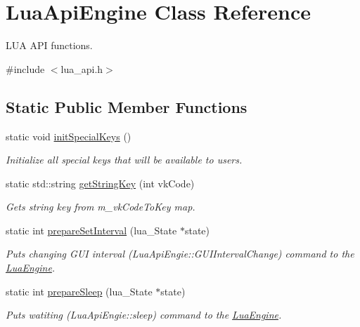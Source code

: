 \hypertarget{class_lua_api_engine}{\section{Lua\-Api\-Engine Class Reference}
\label{class_lua_api_engine}
}


L\-U\-A A\-P\-I functions.  




{\ttfamily \#include $<$lua\-\_\-api.\-h$>$}

\subsection*{Static Public Member Functions}
\begin{DoxyCompactItemize}
\item 
static void \hyperlink{class_lua_api_engine_a7f614e9a85e02951c0a21e694654b83a}{init\-Special\-Keys} ()
\begin{DoxyCompactList}\small\item\em Initialize all special keys that will be available to users. \end{DoxyCompactList}\item 
static std\-::string \hyperlink{class_lua_api_engine_abfc4e4afd5002dddfe5fc2db4519e2fc}{get\-String\-Key} (int vk\-Code)
\begin{DoxyCompactList}\small\item\em Gets string key from m\-\_\-vk\-Code\-To\-Key map. \end{DoxyCompactList}\item 
static int \hyperlink{class_lua_api_engine_a0f3ab3263ec793f35bf0797efdb34aaa}{prepare\-Set\-Interval} (lua\-\_\-\-State $\ast$state)
\begin{DoxyCompactList}\small\item\em Puts changing G\-U\-I interval (Lua\-Api\-Engie\-::\-G\-U\-I\-Interval\-Change) command to the \hyperlink{class_lua_engine}{Lua\-Engine}. \end{DoxyCompactList}\item 
static int \hyperlink{class_lua_api_engine_a03308524bb7be3fca0e5865a0eba6c41}{prepare\-Sleep} (lua\-\_\-\-State $\ast$state)
\begin{DoxyCompactList}\small\item\em Puts watiting (Lua\-Api\-Engie\-::sleep) command to the \hyperlink{class_lua_engine}{Lua\-Engine}. \end{DoxyCompactList}\item 

\end{DoxyCompactItemize}
